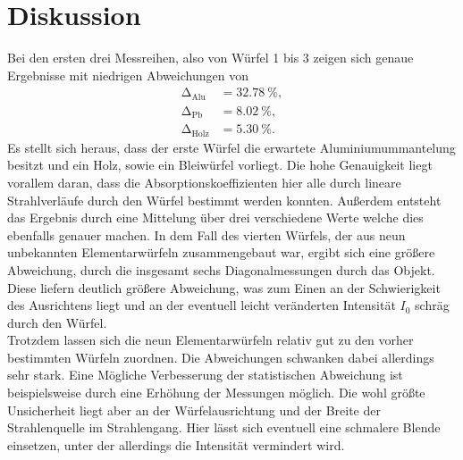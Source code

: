 \section{Diskussion}

Bei den ersten drei Messreihen, also von Würfel 1 bis 3 zeigen sich genaue Ergebnisse mit niedrigen Abweichungen von 
\begin{align*}
\increment_{\text{Alu}} &= \SI{32.78}{\percent}, \\
\increment_{\text{Pb}} &= \SI{8.02}{\percent}, \\
\increment_{\text{Holz}} &= \SI{5.30}{\percent}.
\end{align*}
Es stellt sich heraus, dass der erste Würfel die erwartete Aluminiumummantelung besitzt und ein Holz, sowie ein Bleiwürfel vorliegt.
Die hohe Genauigkeit liegt vorallem daran, dass die Absorptionskoeffizienten hier alle durch lineare Strahlverläufe durch den Würfel bestimmt werden konnten. Außerdem entsteht das Ergebnis durch eine Mittelung über drei verschiedene Werte welche 
dies ebenfalls genauer machen. In dem Fall des vierten Würfels, der aus neun unbekannten Elementarwürfeln zusammengebaut war, ergibt sich eine größere Abweichung, durch die insgesamt sechs Diagonalmessungen durch das Objekt. Diese liefern
deutlich größere Abweichung, was zum Einen an der Schwierigkeit des Ausrichtens liegt und an der eventuell leicht veränderten Intensität $I_0$ schräg durch den Würfel.
\\
\newline
Trotzdem lassen sich die neun Elementarwürfeln relativ gut zu den vorher bestimmten Würfeln zuordnen. Die Abweichungen schwanken dabei allerdings sehr stark. Eine Mögliche Verbesserung der statistischen Abweichung ist beispielsweise durch 
eine Erhöhung der Messungen möglich. Die wohl größte Unsicherheit liegt aber an der Würfelausrichtung und der Breite der Strahlenquelle im Strahlengang. Hier lässt sich eventuell eine schmalere Blende einsetzen, unter der allerdings die Intensität
vermindert wird.